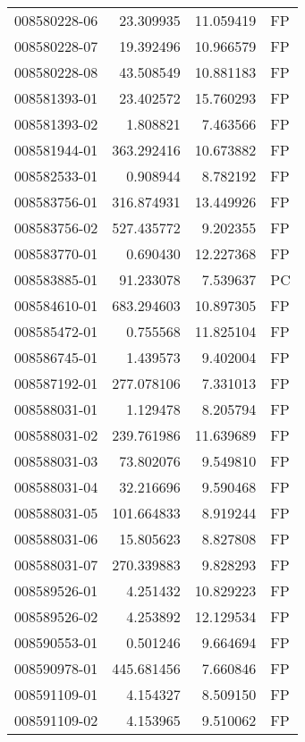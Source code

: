 \begin{tabular}{lrrl}
008580228-06 &   23.309935 &      11.059419 &   FP \\
008580228-07 &   19.392496 &      10.966579 &   FP \\
008580228-08 &   43.508549 &      10.881183 &   FP \\
008581393-01 &   23.402572 &      15.760293 &   FP \\
008581393-02 &    1.808821 &       7.463566 &   FP \\
008581944-01 &  363.292416 &      10.673882 &   FP \\
008582533-01 &    0.908944 &       8.782192 &   FP \\
008583756-01 &  316.874931 &      13.449926 &   FP \\
008583756-02 &  527.435772 &       9.202355 &   FP \\
008583770-01 &    0.690430 &      12.227368 &   FP \\
008583885-01 &   91.233078 &       7.539637 &   PC \\
008584610-01 &  683.294603 &      10.897305 &   FP \\
008585472-01 &    0.755568 &      11.825104 &   FP \\
008586745-01 &    1.439573 &       9.402004 &   FP \\
008587192-01 &  277.078106 &       7.331013 &   FP \\
008588031-01 &    1.129478 &       8.205794 &   FP \\
008588031-02 &  239.761986 &      11.639689 &   FP \\
008588031-03 &   73.802076 &       9.549810 &   FP \\
008588031-04 &   32.216696 &       9.590468 &   FP \\
008588031-05 &  101.664833 &       8.919244 &   FP \\
008588031-06 &   15.805623 &       8.827808 &   FP \\
008588031-07 &  270.339883 &       9.828293 &   FP \\
008589526-01 &    4.251432 &      10.829223 &   FP \\
008589526-02 &    4.253892 &      12.129534 &   FP \\
008590553-01 &    0.501246 &       9.664694 &   FP \\
008590978-01 &  445.681456 &       7.660846 &   FP \\
008591109-01 &    4.154327 &       8.509150 &   FP \\
008591109-02 &    4.153965 &       9.510062 &   FP \\

\end{tabular}
